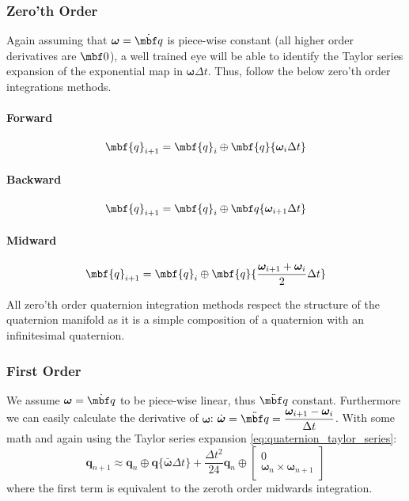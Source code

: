 \documentclass[10pt,a4paper]{article}
\newcommand{\mbs}[1]{{\boldsymbol{#1}}}
\numberwithin{equation}{section}
\begin{document}
\subsubsection{Zero'th Order}
Again assuming that $\mbs \omega = \dot{\mbf q}$ is piece-wise constant (all higher order derivatives are $\mbf 0$), a well trained eye will be able to identify the Taylor series expansion of the exponential map in $\mbs \omega \Delta t$. Thus, follow the below zero'th order integrations methods.

\paragraph{Forward}
\begin{equation}
\mbf{q}_{i+1} = \mbf{q}_i \oplus \mbf{q}\lbrace \mbs{\omega}_i \Delta t \rbrace
\end{equation}

\paragraph{Backward}
\begin{equation}
\mbf{q}_{i+1} = \mbf{q}_i \oplus \mbf q \lbrace \mbs{\omega}_{i+1} \Delta t \rbrace
\end{equation}

\paragraph{Midward}
\begin{equation}
\mbf{q}_{i+1} = \mbf{q}_i \oplus \mbf{q}\lbrace \dfrac{\mbs{\omega}_{i+1} + \mbs{\omega}_{i}}{2} \Delta t \rbrace
\end{equation}

All zero'th order quaternion integration methods respect the structure of the quaternion manifold as it is a simple composition of a quaternion with an infinitesimal quaternion.

\subsubsection{First Order}

We assume $\mbs \omega = \dot{\mbf q}$ to be piece-wise linear, thus $\ddot{\mbf q}$ constant.
Furthermore we can easily calculate the derivative of $\mbs \omega$: $\dot{\mbs \omega} = \ddot{\mbf q} = \dfrac{\mbs \omega_{i+1} - \mbs \omega_i}{\Delta t}$. 
With some math and again using the Taylor series expansion \eqref{eq:quaternion_taylor_series}:
\begin{equation}
\textbf{q}_{n + 1} \approx \textbf{q}_n \oplus \textbf{q}\lbrace \bar{\bm{\omega}} \Delta t \rbrace
+ \dfrac{\Delta t^2}{24} \textbf{q}_n \oplus \begin{bmatrix}
0 \\ \bm \omega_n \times \bm \omega_{n+1}
\end{bmatrix}
\end{equation}
where the first term is equivalent to the zeroth order midwards integration.
\end{document}
